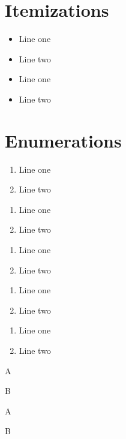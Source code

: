 \documentclass{article}
\begin{document}
\section{Itemizations}
\begin{itemize}
\item Line one
\item Line two
\end{itemize}

\begin{itemize}[label=\dag]
\item Line one
\item Line two
\end{itemize}

\section{Enumerations}
\begin{enumerate}[labelindent=\parindent,leftmargin=*]
\item Line one
\item Line two
\end{enumerate}

\begin{enumerate}[leftmargin=*] %
\item Line one
\item Line two
\end{enumerate}

\begin{enumerate}[leftmargin=\parindent]
\item Line one
\item Line two
\end{enumerate}

\begin{enumerate}[labelindent=\parindent, leftmargin=*, label=\Roman*., widest=III,align=left]
\item Line one
\item Line two
\end{enumerate}

\begin{enumerate}[label=\fbox{\arabic*}]
\item Line one
\item Line two
\end{enumerate}

\begin{fonty}[label=\arabic*)]  \item A \item B\end{fonty}
\begin{fonty}[label=\roman*{]}]  \item A \item B\end{fonty}
\end{document}
